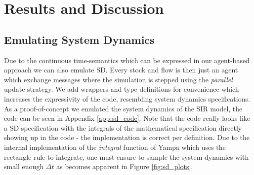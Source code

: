 \section{Results and Discussion}

\subsection{Emulating System Dynamics}
Due to the continuous time-semantics which can be expressed in our agent-based approach we can also emulate SD. Every stock and flow is then just an agent which exchange messages where the simulation is stepped using the \textit{parallel} update-strategy. We add wrappers and type-definitions for convenience which increases the expressivity of the code, resembling system dynamics specifications. As a proof-of-concept we emulated the system dynamics of the SIR model, the code can be seen in Appendix \ref{app:sd_code}. Note that the code really looks like a SD specification with the integrals of the mathematical specification directly showing up in the code - the implementation is correct per definition. Due to the internal implementation of the \textit{integral} function of Yampa which uses the rectangle-rule to integrate, one must ensure to sample the system dynamics with small enough $\Delta t$ as becomes apparent in Figure \ref{fig:sd_plots}.

